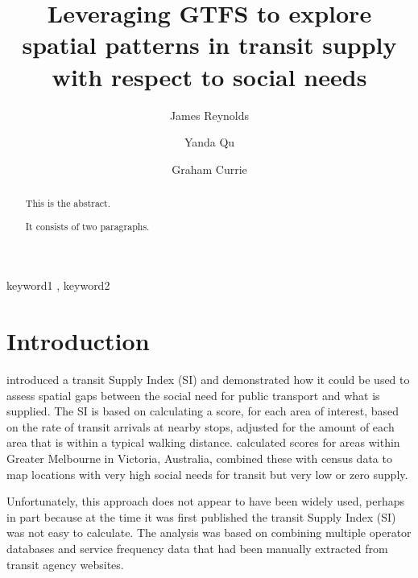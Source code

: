 \documentclass[preprint, 3p,
authoryear]{elsarticle} %
\begin{document}
\begin{frontmatter}

  \title{Leveraging GTFS to explore spatial patterns in transit supply
with respect to social needs}
    \author[Public Transport Research Group (PTRG)]{James Reynolds%
  }
    \author[Public Transport Research Group (PTRG)]{Yanda Qu%
  }
    \author[Public Transport Research Group (PTRG)]{Graham Currie%
  }
  
  \begin{abstract}
  This is the abstract.

  It consists of two paragraphs.
  \end{abstract}
    \begin{keyword}
    keyword1 \sep 
    keyword2
  \end{keyword}
  
 \end{frontmatter}

\hypertarget{introduction}{%
\section{Introduction}\label{introduction}}

\citet{currie2010identifying} introduced a transit Supply Index (SI) and
demonstrated how it could be used to assess spatial gaps between the
social need for public transport and what is supplied. The SI is based
on calculating a score, for each area of interest, based on the rate of
transit arrivals at nearby stops, adjusted for the amount of each area
that is within a typical walking distance. \citet{currie2010identifying}
calculated scores for areas within Greater Melbourne in Victoria,
Australia, combined these with census data to map locations with very
high social needs for transit but very low or zero supply.

Unfortunately, this approach does not appear to have been widely used,
perhaps in part because at the time it was first published the transit
Supply Index (SI) was not easy to calculate. The
\citet{currie2010identifying} analysis was based on combining multiple
operator databases and service frequency data that had been manually
extracted from transit agency websites.
\end{document}
